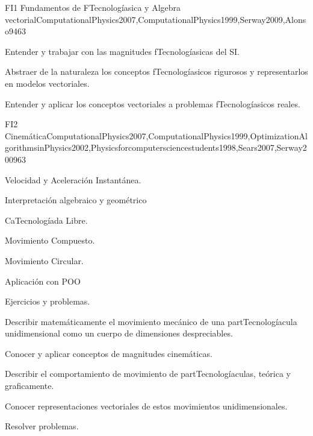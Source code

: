 \begin{syllabus}
\begin{unit}{FI1 Fundamentos de FTecnologíasica y Algebra vectorial}{ComputationalPhysics2007,ComputationalPhysics1999,Serway2009,Alonso94}{6}{3}
   \begin{unitgoals}
      \item Entender y trabajar con las magnitudes fTecnologíasicas del SI.
      \item Abstraer de la naturaleza los conceptos fTecnologíasicos rigurosos y
      representarlos en modelos vectoriales.
      \item Entender y aplicar los conceptos vectoriales a problemas fTecnologíasicos reales.
   \end{unitgoals}
\end{unit}

\begin{unit}{FI2 Cinemática}{ComputationalPhysics2007,ComputationalPhysics1999,OptimizationAlgorithmsinPhysics2002,Physicsforcomputersciencestudents1998,Sears2007,Serway2009}{6}{3}
\begin{topics}
      \item Velocidad y Aceleración Instantánea.
      \item Interpretación algebraico y geométrico
      \item CaTecnologíada Libre.
      \item Movimiento Compuesto.
      \item Movimiento Circular.
      \item Aplicación con POO
      \item Ejercicios y problemas.
    \end{topics}
   \begin{unitgoals}
      \item Describir matemáticamente el movimiento mecánico de una partTecnologíacula unidimensional como un cuerpo de dimensiones despreciables.
      \item Conocer y aplicar conceptos de magnitudes cinemáticas.
      \item Describir el comportamiento de movimiento de partTecnologíaculas, teórica y graficamente.
      \item Conocer representaciones vectoriales de estos movimientos unidimensionales.
      \item Resolver problemas.
   \end{unitgoals}
\end{unit}


\end{syllabus}
